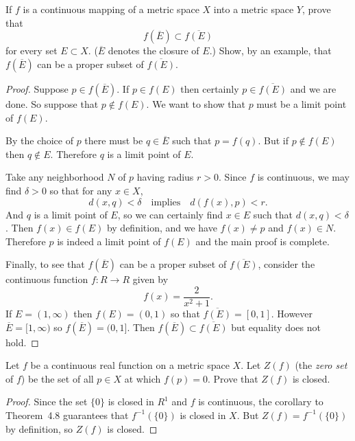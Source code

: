 \label{exercise:continuity:f-of-closure-is-subset-of-closure-of-f}
If $f$ is a continuous mapping of a metric space $X$ into a metric
space $Y$, prove that
\begin{equation*}
  f(\overline{E}) \subset \overline{f(E)}
\end{equation*}
for every set $E\subset X$. ($\overline{E}$ denotes the closure of
$E$.) Show, by an example, that $f(\overline{E})$ can be a proper
subset of $\overline{f(E)}$.
\begin{proof}
  Suppose $p\in f(\overline{E})$. If $p\in f(E)$ then certainly
  $p\in\overline{f(E)}$ and we are done. So suppose that
  $p\not\in f(E)$. We want to show that $p$ must be a limit point of
  $f(E)$.

  By the choice of $p$ there must be $q\in\overline{E}$ such that
  $p = f(q)$. But if $p\not\in f(E)$ then $q\not\in E$. Therefore $q$
  is a limit point of $E$.

  Take any neighborhood $N$ of $p$ having radius $r>0$. Since $f$ is
  continuous, we may find $\delta>0$ so that for any $x\in X$,
  \begin{equation*}
    d(x,q) < \delta
    \quad\text{implies}\quad
    d(f(x),p)<r.
  \end{equation*}
  And $q$ is a limit point of $E$, so we can certainly find $x\in E$
  such that $d(x,q)<\delta$. Then $f(x)\in f(E)$ by definition, and we
  have $f(x)\neq p$ and $f(x)\in N$. Therefore $p$ is indeed a limit
  point of $f(E)$ and the main proof is complete.

  Finally, to see that $f(\overline{E})$ can be a proper subset of
  $\overline{f(E)}$, consider the continuous function $f\colon R\to R$
  given by
  \begin{equation*}
    f(x) = \frac2{x^2 + 1}.
  \end{equation*}
  If $E = (1,\infty)$ then $f(E) = (0,1)$ so that
  $\overline{f(E)} = [0,1]$. However $\overline{E} = [1,\infty)$ so
  $f(\overline{E}) = (0,1]$. Then
  $f(\overline{E})\subset\overline{f(E)}$ but equality does not hold.
\end{proof}

\label{exercise:continuity:zero-set-is-closed}
Let $f$ be a continuous real function on a metric space $X$. Let
$Z(f)$ (the {\em zero set} of $f$) be the set of all $p\in X$ at which
$f(p) = 0$. Prove that $Z(f)$ is closed.
\begin{proof}
  Since the set $\{0\}$ is closed in $R^1$ and $f$ is continuous, the
  corollary to Theorem~4.8 guarantees that $f^{-1}(\{0\})$ is closed
  in $X$. But $Z(f) = f^{-1}(\{0\})$ by definition, so $Z(f)$ is
  closed.
\end{proof}

